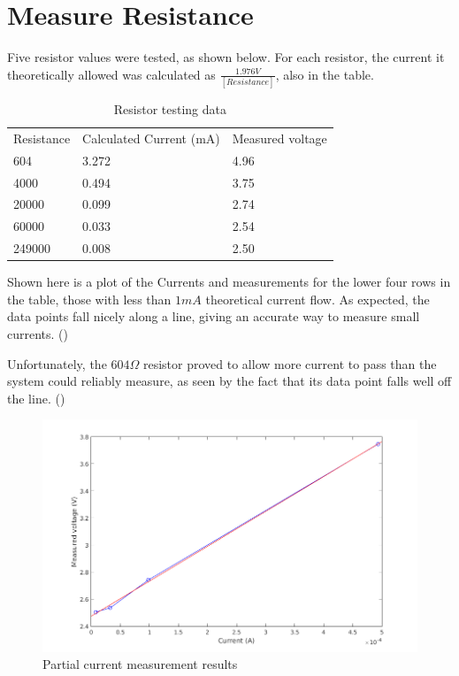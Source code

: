 \documentclass[11pt]{article} %
\begin{document}
\section{Measure Resistance}

Five resistor values were tested, as shown below. For each resistor, the current it theoretically allowed was calculated as $\frac {1.976V} {[Resistance]}$, also in the table.
\begin{table}[H]
\centering
\caption{Resistor testing data}
\begin{tabular}{lll}
Resistance & Calculated Current (mA) & Measured voltage \\
604        & 3.272                   & 4.96             \\
4000       & 0.494                   & 3.75             \\
20000      & 0.099                   & 2.74             \\
60000      & 0.033                   & 2.54             \\
249000     & 0.008                   & 2.50            
\end{tabular}
\end{table}

Shown here is a plot of the Currents and measurements for the lower four rows in the table, those with less than $1mA$ theoretical current flow. As expected, the data points fall nicely along a line, giving an accurate way to measure small currents. ()

Unfortunately, the $604\Omega$ resistor proved to allow more current to pass than the system could reliably measure, as seen by the fact that its data point falls well off the line. ()



\begin{figure}[]
	\centering
	\includegraphics[width=\textwidth]{4points-current.png}
	\caption{Partial current measurement results}
 	\label{fig:some}
\end{figure}
\end{document}
